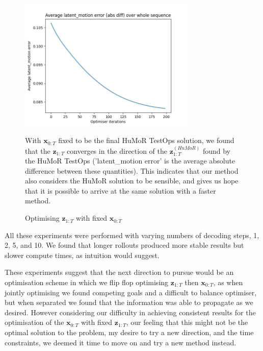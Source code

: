 \begin{figure}
    \centering
    \includegraphics[width=0.75\textwidth]{Figures/humor/experiments/avg_latent_motion_error.png}
    \caption{Optimising $\mathbf{z}_{1:T}$ with fixed $\mathbf{x}_{0:T}$}
    \label{fig:zs_converge_to_humor_zs}
    \medskip
    \small
    With $\mathbf{x}_{0:T}$ fixed to be the final HuMoR TestOps solution, we found that the $\mathbf{z}_{1:T}$ converges in the direction of the $\mathbf{z}_{1:T}^{(HuMoR)}$ found by the HuMoR TestOps ('latent\_motion error' is the average absolute difference between these quantities). This indicates that our method also considers the HuMoR solution to be sensible, and gives us hope that it is possible to arrive at the same solution with a faster method.
\end{figure}


All these experiments were performed with varying numbers of decoding steps, 1, 2, 5, and 10. We found that longer rollouts produced more stable results but slower compute times, as intuition would suggest. 

These experiments suggest that the next direction to pursue would be an optimisation scheme in which we flip flop optimising $\mathbf{z}_{1:T}$ then $\mathbf{x}_{0:T}$, as when jointly optimising we found competing goals and a difficult to balance optimiser, but when separated we found that the information was able to propagate as we desired. However considering our difficulty in achieving consistent results for the optimisation of the $\mathbf{x}_{0:T}$ with fixed $\mathbf{z}_{1:T}$, our feeling that this might not be the optimal solution to the problem, my desire to try a new direction, and the time constraints, we deemed it time to move on and try a new method instead.

